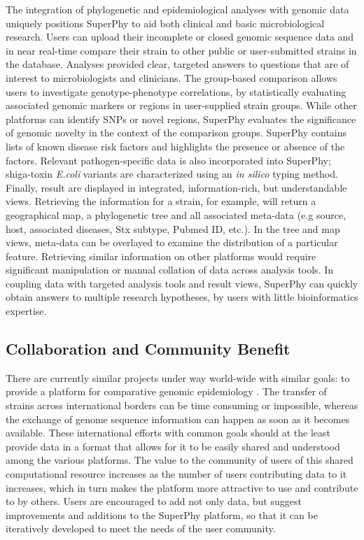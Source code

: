 \documentclass[a4paper,twoside]{article}
\begin{document}
The integration of phylogenetic and epidemiological analyses with genomic data uniquely positions SuperPhy to aid both clinical and basic microbiological research. Users can upload their incomplete or closed genomic sequence data and in near real-time compare their strain to other public or user-submitted strains in the database. Analyses provided clear, targeted answers to questions that are of interest to microbiologists and clinicians.  The group-based comparison allows users to investigate genotype-phenotype correlations, by statistically evaluating associated genomic markers or regions in user-supplied strain groups. While other platforms can identify SNPs or novel regions, SuperPhy evaluates the significance of genomic novelty in the context of the comparison groups. SuperPhy contains lists of known disease risk factors and highlights the presence or absence of the factors. Relevant pathogen-specific data is also incorporated into SuperPhy; shiga-toxin \textit{E.coli} variants are characterized using an \textit{in silico} typing method. Finally, result are displayed in integrated, information-rich, but understandable views. Retrieving the information for a strain, for example, will return a geographical map, a phylogenetic tree and all associated meta-data (e.g source, host, associated diseases, Stx subtype, Pubmed ID, etc.). In the tree and map views, meta-data can be overlayed to examine the distribution of a particular feature.  Retrieving similar information on other platforms would require significant manipulation or manual collation of data across analysis tools. In coupling data with targeted analysis tools and result views, SuperPhy can quickly obtain answers to multiple research hypotheses, by users with little bioinformatics expertise.

\subsection{Collaboration and Community Benefit}
\label{sec:collaboration}
There are currently similar projects under way world-wide with similar goals: to provide a platform for comparative genomic epidemiology \cite{kupferschmidt_outbreak_2011}. The transfer of strains across international borders can be time consuming or impossible, whereas the exchange of genome sequence information can happen as soon as it becomes available. These international efforts with common goals should at the least provide data in a format that allows for it to be easily shared and understood among the various platforms. The value to the community of users of this shared computational resource increases as the number of users contributing data to it increases, which in turn makes the platform more attractive to use and contribute to by others. Users are encouraged to add not only data, but suggest improvements and additions to the SuperPhy platform, so that it can be iteratively developed to meet the needs of the user community.
\end{document}
